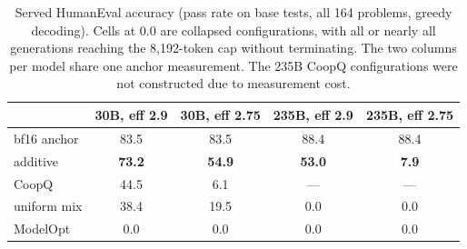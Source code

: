 
\begin{table}[t]
\centering\small
\caption{Served HumanEval accuracy (pass rate on base tests, all 164 problems, greedy decoding).
Cells at 0.0 are collapsed
configurations, with all or nearly all generations reaching the 8{,}192-token cap without terminating.
The two columns per model share one anchor measurement. The 235B CoopQ configurations
were not constructed due to measurement cost.}
\label{tab:sub4code}
\begin{tabular}{lcccc}
\toprule
 & 30B, eff 2.9 & 30B, eff 2.75 & 235B, eff 2.9 & 235B, eff 2.75 \\
\midrule
bf16 anchor & 83.5 & 83.5 & 88.4 & 88.4 \\
additive & \textbf{73.2} & \textbf{54.9} & \textbf{53.0} & \textbf{7.9} \\
CoopQ & 44.5 & 6.1 & --- & --- \\
uniform mix & 38.4 & 19.5 & 0.0 & 0.0 \\
ModelOpt & 0.0 & 0.0 & 0.0 & 0.0 \\
\bottomrule
\end{tabular}
\end{table}

